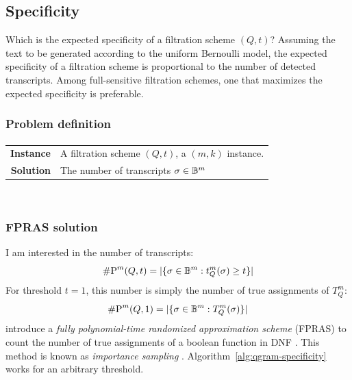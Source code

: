 \subsection{Specificity}
\label{sub:qgram-specificity}

Which is the expected specificity of a filtration scheme $(Q,t)$?
Assuming the text to be generated according to the uniform Bernoulli model, the expected specificity of a filtration scheme is proportional to the number of detected transcripts.
Among full-sensitive filtration schemes, one that maximizes the expected specificity is preferable.

\subsubsection{Problem definition}

\paragraph{}
\begin{tabular}{rl}
{\bf Instance}	&	A filtration scheme $(Q,t)$, a $(m,k)$ instance.\\
{\bf Solution}	&	The number of transcripts $\sigma \in \mathbb {B}^{m}$ \st $t_{Q}^{m}(\sigma) \geq t$\\
\end{tabular}
\\


\subsubsection{FPRAS solution}

I am interested in the number of transcripts:
\begin{equation}
\text{\#P}^{m}(Q,t) = | \{ \sigma \in \mathbb {B}^{m} : t_{Q}^{m}(\sigma) \geq t \} |
\end{equation}
For threshold $t=1$, this number is simply the number of true assignments of $T_{Q}^{m}$:
\begin{equation}
\text{\#P}^{m}(Q,1) = | \{ \sigma \in \mathbb {B}^{m} : T_{Q}^{m}(\sigma) \} |
\end{equation}
\citeauthor{Karp1989} introduce a \emph{fully polynomial-time randomized approximation scheme} (FPRAS) \citep{Vazirani2001} to count the number of true assignments of a boolean function in DNF \citep{Karp1989}.
This method is known as \emph{importance sampling} \citep{Vazirani2001}.
Algorithm~\ref{alg:qgram-specificity} works for an arbitrary threshold.


